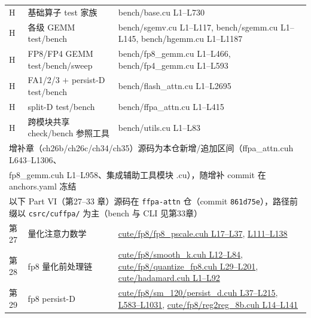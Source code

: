 \begin{longtable}{llp{7.2cm}}
H & 基础算子 test 家族 & bench/base.cu L1--L730 \\
H & 各级 GEMM test/bench & bench/sgemv.cu L1--L117, bench/sgemm.cu L1--L145, bench/hgemm.cu L1--L1187 \\
H & FP8/FP4 GEMM test/bench/sweep & bench/fp8\_gemm.cu L1--L466, bench/fp4\_gemm.cu L1--L593 \\
H & FA1/2/3 $+$ persist-D test/bench & bench/flash\_attn.cu L1--L2695 \\
H & split-D test/bench & bench/ffpa\_attn.cu L1--L415 \\
H & 跨模块共享 check/bench 参照工具 & bench/utils.cu L1--L83 \\
\multicolumn{3}{l}{\footnotesize 增补章（ch26b/ch26c/ch34/ch35）源码为本仓新增/追加区间（ffpa\_attn.cuh L643--L1306、} \\
\multicolumn{3}{l}{\footnotesize fp8\_gemm.cuh L1--L958、集成辅助工具模块 .cu），随增补 commit 在 anchors.yaml 冻结} \\
\multicolumn{3}{l}{\footnotesize 以下 Part VI（第27--33 章）源码在 \texttt{ffpa-attn} 仓（commit \texttt{861d75e}），路径前缀以 \texttt{csrc/cuffpa/} 为主（bench 与 CLI 见第33章）} \\
第27 & 量化注意力数学 & \href{https://github.com/xlite-dev/ffpa-attn/blob/861d75ee87824a14a9ebfe295d54c7dac3e3cabc/csrc/cuffpa/cute/fp8/fp8_pscale.cuh#L17-L37}{cute/fp8/fp8\_pscale.cuh L17--L37}, \href{https://github.com/xlite-dev/ffpa-attn/blob/861d75ee87824a14a9ebfe295d54c7dac3e3cabc/csrc/cuffpa/cute/fp8/fp8_pscale.cuh#L111-L138}{L111--L138} \\
第28 & fp8 量化前处理链 & \href{https://github.com/xlite-dev/ffpa-attn/blob/861d75ee87824a14a9ebfe295d54c7dac3e3cabc/csrc/cuffpa/cute/fp8/smooth_k.cuh#L12-L84}{cute/fp8/smooth\_k.cuh L12--L84}, \href{https://github.com/xlite-dev/ffpa-attn/blob/861d75ee87824a14a9ebfe295d54c7dac3e3cabc/csrc/cuffpa/cute/fp8/quantize_fp8.cuh#L29-L201}{cute/fp8/quantize\_fp8.cuh L29--L201}, \href{https://github.com/xlite-dev/ffpa-attn/blob/861d75ee87824a14a9ebfe295d54c7dac3e3cabc/csrc/cuffpa/cute/hadamard.cuh#L1-L92}{cute/hadamard.cuh L1--L92} \\
第29 & fp8 persist-D & \href{https://github.com/xlite-dev/ffpa-attn/blob/861d75ee87824a14a9ebfe295d54c7dac3e3cabc/csrc/cuffpa/cute/fp8/sm_120/persist_d.cuh#L37-L215}{cute/fp8/sm\_120/persist\_d.cuh L37--L215}, \href{https://github.com/xlite-dev/ffpa-attn/blob/861d75ee87824a14a9ebfe295d54c7dac3e3cabc/csrc/cuffpa/cute/fp8/sm_120/persist_d.cuh#L583-L1031}{L583--L1031}, \href{https://github.com/xlite-dev/ffpa-attn/blob/861d75ee87824a14a9ebfe295d54c7dac3e3cabc/csrc/cuffpa/cute/fp8/reg2reg_8b.cuh#L14-L141}{cute/fp8/reg2reg\_8b.cuh L14--L141} \\

\end{longtable}
